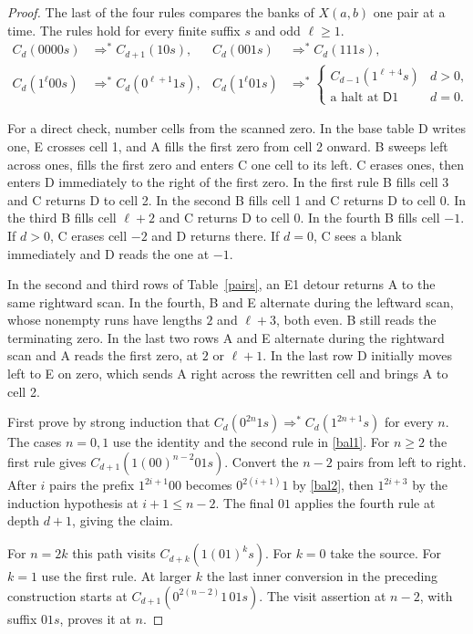 \documentclass[11pt]{article}
\newcommand{\state}[1]{\mathsf{#1}}
\newcommand{\run}{\mathrel{\Rightarrow^{*}}}
\begin{document}
\begin{proof}
The last of the four rules compares the banks of \(X(a,b)\) one pair at a time. The rules hold for every finite suffix \(s\) and odd \(\ell\ge1\).
\begin{align}
 C_d(0000s)&\run C_{d+1}(10s),&
 C_d(001s)&\run C_d(111s),\label{bal1}\\
 C_d(1^\ell00s)&\run C_d(0^{\ell+1}1s),&
 C_d(1^\ell01s)&\run
 \begin{cases} C_{d-1}(1^{\ell+4}s)&d>0,\\
                 \text{a halt at }\state D1&d=0 .
 \end{cases}\label{bal2}
\end{align}

For a direct check, number cells from the scanned zero. In the base table D writes one, E crosses cell 1, and A fills the first zero from cell 2 onward. B sweeps left across ones, fills the first zero and enters C one cell to its left. C erases ones, then enters D immediately to the right of the first zero. In the first rule B fills cell 3 and C returns D to cell 2. In the second B fills cell 1 and C returns D to cell 0. In the third B fills cell \(\ell+2\) and C returns D to cell 0. In the fourth B fills cell \(-1\). If \(d>0\), C erases cell \(-2\) and D returns there. If \(d=0\), C sees a blank immediately and D reads the one at \(-1\).

In the second and third rows of Table~\ref{pairs}, an E1 detour returns A to the same rightward scan. In the fourth, B and E alternate during the leftward scan, whose nonempty runs have lengths \(2\) and \(\ell+3\), both even. B still reads the terminating zero. In the last two rows A and E alternate during the rightward scan and A reads the first zero, at \(2\) or \(\ell+1\). In the last row D initially moves left to E on zero, which sends A right across the rewritten cell and brings A to cell 2.

First prove by strong induction that \(C_d(0^{2n}1s)\run C_d(1^{2n+1}s)\) for every \(n\). The cases \(n=0,1\) use the identity and the second rule in \eqref{bal1}. For \(n\ge2\) the first rule gives \(C_{d+1}(1(00)^{n-2}01s)\). Convert the \(n-2\) pairs from left to right. After \(i\) pairs the prefix \(1^{2i+1}00\) becomes \(0^{2(i+1)}1\) by \eqref{bal2}, then \(1^{2i+3}\) by the induction hypothesis at \(i+1\le n-2\). The final \(01\) applies the fourth rule at depth \(d+1\), giving the claim.

For \(n=2k\) this path visits \(C_{d+k}(1(01)^ks)\). For \(k=0\) take the source. For \(k=1\) use the first rule. At larger \(k\) the last inner conversion in the preceding construction starts at \(C_{d+1}(0^{2(n-2)}1\,01s)\). The visit assertion at \(n-2\), with suffix \(01s\), proves it at \(n\).


\end{proof}
\end{document}
